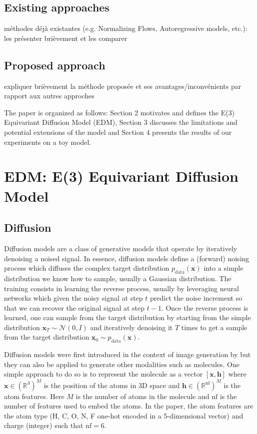 \documentclass[sigconf]{acmart}
\begin{document}
\subsection{Existing approaches}
méthodes déjà existantes (e.g. Normalizing Flows, Autoregressive models, etc.): les présenter brièvement et les comparer
\subsection{Proposed approach}
expliquer brièvement la méthode proposée et ses avantages/inconvénients par rapport aux autres approches

The paper is organized as follows: Section 2 motivates and defines the E(3) Equivariant Diffusion Model (EDM), Section 3 discusses the limitations and potential extensions of the model and Section 4 presents the results of our experiments on a toy model.


\section{EDM: E(3) Equivariant Diffusion Model} %
\subsection{Diffusion}
Diffusion models are a class of generative models that operate by iteratively denoising a noised signal.
In essence, diffusion models define a (forward) noising process which diffuses the complex target distribution $p_\text{data}(\mathbf{x})$ into a simple distribution we know how to sample, usually a Gaussian distribution.
The training consists in learning the reverse process, usually by leveraging neural networks which given the noisy signal at step $t$ predict the noise increment so that we can recover the original signal at step $t-1$.
Once the reverse process is learned, one can sample from the target distribution by starting from the simple distribution $\mathbf{x}_T \sim \mathcal{N}(0, I)$ and iteratively denoising it $T$ times to get a sample from the target distribution $\mathbf{x}_0 \sim p_\text{data}(\mathbf{x})$.

Diffusion models were first introduced in the context of image generation by \cite{ddpm} but they can also be applied to generate other modalities such as molecules.
One simple approach to do so is to represent the molecule as a vector $\left[ \mathbf{x}, \mathbf{h} \right]$ where $\mathbf{x} \in (\mathbb{R}^3)^M$ is the position of the atoms in 3D space and $\mathbf{h} \in (\mathbb{R}^\text{nf})^M$ is the atom features.
Here $M$ is the number of atoms in the molecule and $\text{nf}$ is the number of features used to embed the atoms.
In the paper, the atom features are the atom type (H, C, O, N, F one-hot encoded in a 5-dimensional vector) and charge (integer) such that $\text{nf} = 6$.
\end{document}
